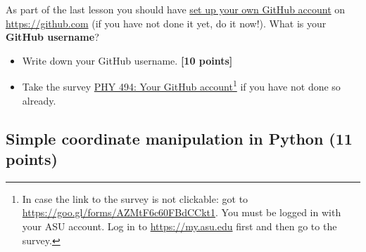 \documentclass[letterpaper]{scrartcl}
\newcounter{TotalPoints}
\newcommand{\points}[1]{\textbf{[#1 points]}\stepcounter{TotalPoints}}
\begin{document}
As part of the last lesson you should have
\href{http://asu-compmethodsphysics-phy494.github.io/ASU-PHY494/page2/#set-up-your-own-github-repositories}{set
  up your own GitHub account} on \url{https://github.com} (if you have
not done it yet, do it now!). What is your \textbf{GitHub username}?
\begin{itemize}
\item Write down your GitHub username. \points{10}
\item Take the survey
  \href{https://goo.gl/forms/eA0BZ4xMMijsY8Gp2}{PHY
    494: Your GitHub account}\footnote{In case the link to the survey
    is not clickable: got to
    \url{https://goo.gl/forms/AZMtF6c60FBdCCkt1}. You must be logged
    in with your ASU account. Log in to \url{https://my.asu.edu} first
    and then go to the survey.} if you have not done so already.
\end{itemize}


\subsection{Simple coordinate manipulation in Python (11 points)}
\end{document}
